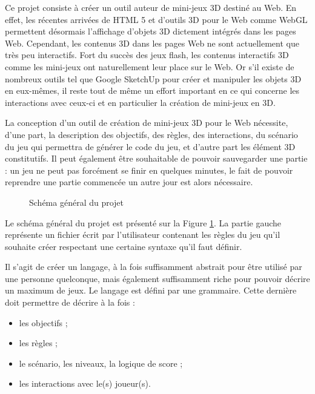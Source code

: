 Ce projet consiste à créer un outil auteur de mini-jeux 3D destiné au Web.
En effet, les récentes arrivées de HTML 5 et d'outils 3D pour le Web comme WebGL permettent désormais l'affichage d'objets 3D dictement
intégrés dans les pages Web.
Cependant, les contenus 3D dans les pages Web ne sont actuellement que très peu interactifs.
Fort du succès des jeux flash, les contenus interactifs 3D comme les mini-jeux ont naturellement leur place sur le Web.
Or s'il existe de nombreux outils tel que Google SketchUp pour créer et manipuler les objets 3D en eux-mêmes,
il reste tout de même un effort important en ce qui concerne les interactions avec ceux-ci et en particulier la création de mini-jeux en 3D.

\vspace{0.5cm}

La conception d'un outil de création de mini-jeux 3D pour le Web nécessite, d'une part, la description des objectifs, des règles, des interactions, 
du scénario du jeu qui permettra de générer le code du jeu, et d'autre part les élément 3D constitutifs.
Il peut également être souhaitable de pouvoir sauvegarder une partie :
un jeu ne peut pas forcément se finir en quelques minutes, le fait de pouvoir reprendre une partie commencée un autre jour est alors nécessaire.

\begin{figure}[h]
 \caption{Schéma général du projet}
 \label{fig:schemaprojet}
\end{figure}

Le schéma général du projet est présenté sur la Figure \ref{fig:schemaprojet}.
La partie gauche représente un fichier écrit par l'utilisateur contenant les règles du jeu qu'il souhaite créer respectant
une certaine syntaxe qu'il faut définir.

Il s'agit de créer un langage, à la fois suffisamment abstrait pour être utilisé par une personne quelconque, mais également suffisamment riche
pour pouvoir décrire un maximum de jeux.
Le langage est défini par une grammaire.
Cette dernière doit permettre de décrire à la fois :
\begin{itemize}
 \item les objectifs ;
 \item les règles ;
 \item le scénario, les niveaux, la logique de score ;
 \item les interactions avec le(s) joueur(s).
\end{itemize}

